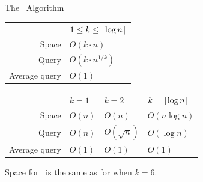 \documentclass{beamer}
\begin{document}
\begin{frame}{The \fprintk\ Algorithm}
    \begin{tabular}{r l}
        & $1\leq k\leq\lceil\log n\rceil$ \\
        Space & $O(k\cdot n)$\\
        Query & $O(k\cdot n^{1/k})$ \\
        Average query & $O(1)$ \\
    \end{tabular}

    \vspace{2em}

    \begin{tabular}{r l l l}
        & $k=1$ & $k=2$ & $k=\lceil\log n\rceil$ \\
        Space & $O(n)$ & $O(n)$ & $O(n\log n)$ \\
        Query & $O(n)$ & $O(\sqrt n)$ & $O(\log n)$ \\
        Average query & $O(1)$ & $O(1)$ & $O(1)$ \\
    \end{tabular}
    
    \vspace{2em}
    
    Space for \fprintk\ is the same as for  when $k=6$.
\end{frame}
\end{document}
